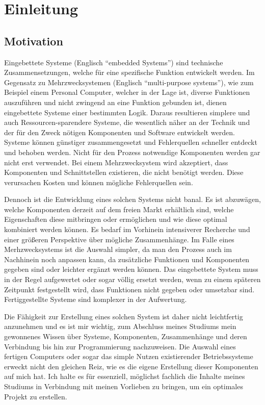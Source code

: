 \hypertarget{einleitung}{%
\chapter{Einleitung}\label{einleitung}}

\hypertarget{motivation}{%
\section{Motivation}\label{motivation}}

Eingebettete Systeme (Englisch ``embedded Systems'') sind technische
Zusammensetzungen, welche für eine spezifische Funktion entwickelt
werden. Im Gegensatz zu Mehrzwecksystemen (Englisch ``multi-purpose
systems''), wie zum Beispiel einem Personal Computer, welcher in der
Lage ist, diverse Funktionen auszuführen und nicht zwingend an eine
Funktion gebunden ist, dienen eingebettete Systeme einer bestimmten
Logik. Daraus resultieren simplere und auch Ressourcen-sparendere
Systeme, die wesentlich näher an der Technik und der für den Zweck
nötigen Komponenten und Software entwickelt werden. Systeme können
günstiger zusammengesetzt und Fehlerquellen schneller entdeckt und
behoben werden. Nicht für den Prozess notwendige Komponenten werden gar
nicht erst verwendet. Bei einem Mehrzwecksystem wird akzeptiert, dass
Komponenten und Schnittstellen existieren, die nicht benötigt werden.
Diese verursachen Kosten und können mögliche Fehlerquellen sein.

Dennoch ist die Entwicklung eines solchen Systems nicht banal. Es ist
abzuwägen, welche Komponenten derzeit auf dem freien Markt erhältlich
sind, welche Eigenschaften diese mitbringen oder ermöglichen und wie
diese optimal kombiniert werden können. Es bedarf im Vorhinein
intensiverer Recherche und einer größeren Perspektive über mögliche
Zusammenhänge. Im Falle eines Merhzwecksystems ist die Auswahl simpler,
da man den Prozess auch im Nachhinein noch anpassen kann, da zusätzliche
Funktionen und Komponenten gegeben sind oder leichter ergänzt werden
können. Das eingebettete System muss in der Regel aufgewertet oder sogar
völlig ersetzt werden, wenn zu einem späteren Zeitpunkt festgestellt
wird, dass Funktionen nicht gegeben oder umsetzbar sind. Fertiggestellte
Systeme sind komplexer in der Aufwertung.

Die Fähigkeit zur Erstellung eines solchen System ist daher nicht
leichtfertig anzunehmen und es ist mir wichtig, zum Abschluss meines
Studiums mein gewonnenes Wissen über Systeme, Komponenten, Zusammenhänge
und deren Verbindung bis hin zur Programmierung nachzuweisen. Die
Auswahl eines fertigen Computers oder sogar das simple Nutzen
existierender Betriebssysteme erweckt nicht den gleichen Reiz, wie es
die eigene Erstellung dieser Komponenten auf mich hat. Ich halte es für
essenziell, möglichst fachlich die Inhalte meines Studiums in Verbindung
mit meinen Vorlieben zu bringen, um ein optimales Projekt zu erstellen.

